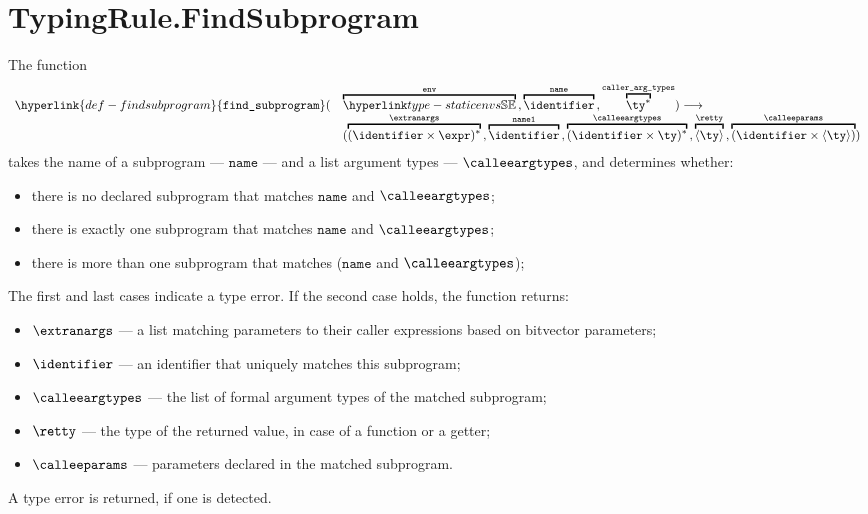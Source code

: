 \documentclass{book}
\newcommand\findsubprogram[0]{\hyperlink{def-findsubprogram}{\texttt{find\_subprogram}}}
\newcommand\nameone[0]{\texttt{name1}}
\newcommand\name[0]{\texttt{name}}
\begin{document}

\section{TypingRule.FindSubprogram \label{sec:TypingRule.FindSubprogram}}
\hypertarget{def-findsubprogram}{}
The function
\[
  \begin{array}{rl}
    \findsubprogram( &
      \overname{\staticenvs}{\tenv} \aslsep
      \overname{\identifier}{\name} \aslsep
      \overname{\ty^*}{\callerargtypes}
     ) \aslto \\ &
    (
      \overname{(\identifier\times\expr)^*}{\extranargs} \aslsep
      \overname{\identifier}{\nameone} \aslsep
      \overname{(\identifier\times\ty)^*}{\calleeargtypes} \aslsep
      \overname{\langle\ty\rangle}{\retty} \aslsep
      \overname{(\identifier \times \langle\ty\rangle)}{\calleeparams}
    )
  \end{array}
\]
takes the name of a subprogram --- $\name$ --- and a list argument types --- $\calleeargtypes$,
and determines whether:
\begin{itemize}
  \item there is no declared subprogram that matches $\name$ and $\calleeargtypes$;
  \item there is exactly one subprogram that matches $\name$ and $\calleeargtypes$;
  \item there is more than one subprogram that matches ($\name$ and $\calleeargtypes$);
\end{itemize}
The first and last cases indicate a type error.
If the second case holds, the function returns:
\begin{itemize}
\item $\extranargs$ --- a list matching parameters to their caller expressions based on bitvector parameters;
\item $\identifier$ --- an identifier that uniquely matches this subprogram;
\item $\calleeargtypes$ --- the list of formal argument types of the matched subprogram;
\item $\retty$ --- the type of the returned value, in case of a function or a getter;
\item $\calleeparams$ --- parameters declared in the matched subprogram.
\end{itemize}
A type error is returned, if one is detected.
\end{document}
